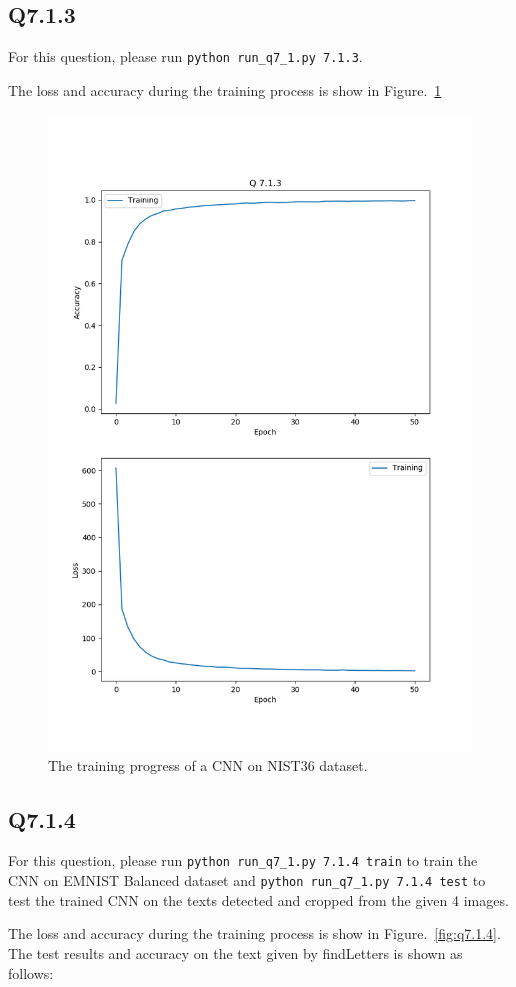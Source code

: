 \documentclass[11pt]{article}
\newcommand{\code}[1]{\texttt{#1}}
\begin{document}
\newpage
\subsection*{Q7.1.3}

For this question, please run \code{python run\_q7\_1.py 7.1.3}.

The loss and accuracy during the training process is show in Figure.~\ref{fig:q7.1.3}

\begin{figure}[h!]
    \centering
    \includegraphics[width=.6\linewidth]{../results/q7_1_3.png}
    \caption{The training progress of a CNN on NIST36 dataset. }
    \label{fig:q7.1.3}
\end{figure}

\newpage
\subsection*{Q7.1.4}

For this question, please run \code{python run\_q7\_1.py 7.1.4 train} to train the CNN on EMNIST Balanced dataset and \code{python run\_q7\_1.py 7.1.4 test} to test the trained CNN on the texts detected and cropped from the given 4 images.

The loss and accuracy during the training process is show in Figure.~\ref{fig:q7.1.4}. The test results and accuracy on the text given by findLetters is shown as follows:
\end{document}
